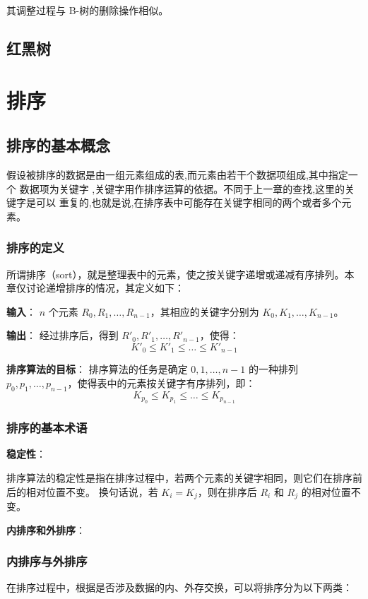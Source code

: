 \documentclass[lang=cn,newtx,10pt,scheme=chinese]{elegantbook}
\begin{document}
      其调整过程与 B-树的删除操作相似。
\section{红黑树}
\chapter{排序}

\section{排序的基本概念}
假设被排序的数据是由一组元素组成的表,而元素由若干个数据项组成,其中指定一个
数据项为关键字 ,关键字用作排序运算的依据。不同于上一章的查找,这里的关键字是可以
重复的,也就是说,在排序表中可能存在关键字相同的两个或者多个元素。

 

\subsection{排序的定义}

所谓排序（sort），就是整理表中的元素，使之按关键字递增或递减有序排列。本章仅讨论递增排序的情况，其定义如下：


\textbf{输入}：  
$n$ 个元素 $R_0, R_1, \dots, R_{n-1}$，其相应的关键字分别为 $K_0, K_1, \dots, K_{n-1}$。


\textbf{输出}：  
经过排序后，得到 $R'_0, R'_1, \dots, R'_{n-1}$，使得：
\[
K'_0 \leq K'_1 \leq \dots \leq K'_{n-1}
\]


\textbf{排序算法的目标}：  
排序算法的任务是确定 $0, 1, \dots, n-1$ 的一种排列 $p_0, p_1, \dots, p_{n-1}$，使得表中的元素按关键字有序排列，即：
\[
K_{p_0} \leq K_{p_1} \leq \dots \leq K_{p_{n-1}}
\]

\subsection{排序的基本术语}

\textbf{稳定性}：

排序算法的稳定性是指在排序过程中，若两个元素的关键字相同，则它们在排序前后的相对位置不变。
换句话说，若 $K_i = K_j$，则在排序后 $R_i$ 和 $R_j$ 的相对位置不变。

\textbf{内排序和外排序}：
\subsection{内排序与外排序}

在排序过程中，根据是否涉及数据的内、外存交换，可以将排序分为以下两类：
\end{document}
